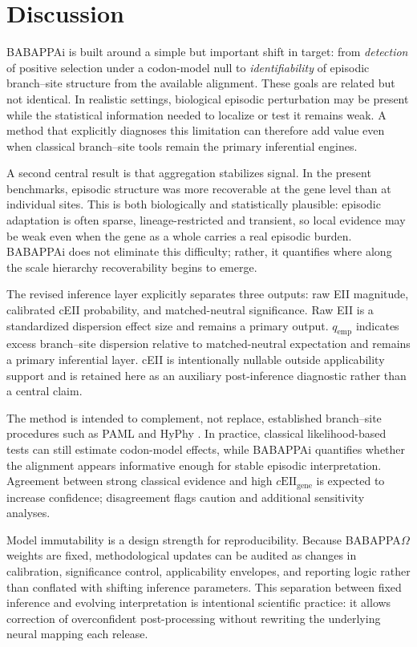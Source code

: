 \documentclass[11pt]{article}
\begin{document}
\section{Discussion}

BABAPPAi is built around a simple but important shift in target: from \emph{detection} of positive selection under a codon-model null to \emph{identifiability} of episodic branch--site structure from the available alignment. These goals are related but not identical. In realistic settings, biological episodic perturbation may be present while the statistical information needed to localize or test it remains weak. A method that explicitly diagnoses this limitation can therefore add value even when classical branch--site tools remain the primary inferential engines.

A second central result is that aggregation stabilizes signal. In the present benchmarks, episodic structure was more recoverable at the gene level than at individual sites. This is both biologically and statistically plausible: episodic adaptation is often sparse, lineage-restricted and transient, so local evidence may be weak even when the gene as a whole carries a real episodic burden. BABAPPAi does not eliminate this difficulty; rather, it quantifies where along the scale hierarchy recoverability begins to emerge.

The revised inference layer explicitly separates three outputs: raw EII magnitude, calibrated cEII probability, and matched-neutral significance. Raw EII is a standardized dispersion effect size and remains a primary output. $q_{\mathrm{emp}}$ indicates excess branch--site dispersion relative to matched-neutral expectation and remains a primary inferential layer. cEII is intentionally nullable outside applicability support and is retained here as an auxiliary post-inference diagnostic rather than a central claim.

The method is intended to complement, not replace, established branch--site procedures such as PAML and HyPhy \cite{Yang2007,Murrell2012,KosakovskyPond2011,KosakovskyPond2020}. In practice, classical likelihood-based tests can still estimate codon-model effects, while BABAPPAi quantifies whether the alignment appears informative enough for stable episodic interpretation. Agreement between strong classical evidence and high $c\mathrm{EII}_{\mathrm{gene}}$ is expected to increase confidence; disagreement flags caution and additional sensitivity analyses.

Model immutability is a design strength for reproducibility. Because BABAPPA$\Omega$ weights are fixed, methodological updates can be audited as changes in calibration, significance control, applicability envelopes, and reporting logic rather than conflated with shifting inference parameters. This separation between fixed inference and evolving interpretation is intentional scientific practice: it allows correction of overconfident post-processing without rewriting the underlying neural mapping each release.
\end{document}

